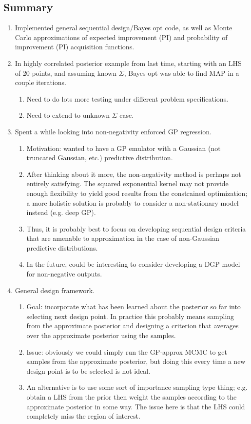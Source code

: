 \documentclass[12pt]{article}
\begin{document}
\subsection{Summary}
\begin{enumerate}
\item Implemented general sequential design/Bayes opt code, as well as Monte Carlo approximations of expected improvement (PI) and probability of 
improvement (PI) acquisition functions. 
\item In highly correlated posterior example from last time, starting with an LHS of 20 points, and assuming known $\Sigma$, Bayes opt was able to find MAP in a couple iterations. 
	\begin{enumerate}
	\item Need to do lots more testing under different problem specifications. 
	\item Need to extend to unknown $\Sigma$ case. 
	\end{enumerate}
\item Spent a while looking into non-negativity enforced GP regression. 
	\begin{enumerate}
	\item Motivation: wanted to have a GP emulator with a Gaussian (not truncated Gaussian, etc.) predictive distribution.   
	\item After thinking about it more, the non-negativity method is perhaps not entirely satisfying. The squared exponential kernel may not provide enough flexibility to 
	yield good results from the constrained optimization; a more holistic solution is probably to consider a non-stationary model instead (e.g. deep GP). 
	\item Thus, it is probably best to focus on developing sequential design criteria that are amenable to approximation in the case of non-Gaussian predictive distributions. 
	\item In the future, could be interesting to consider developing a DGP model for non-negative outputs. 
	\end{enumerate}
\item General design framework.
	\begin{enumerate}
	\item Goal: incorporate what has been learned about the posterior so far into selecting next design point. In practice this probably means sampling from the approximate 
	posterior and designing a criterion that averages over the approximate posterior using the samples. 
	\item Issue: obviously we could simply run the GP-approx MCMC to get samples from the approximate posterior, but doing this every time a new design point is to be selected is 
	not ideal. 
	\item An alternative is to use some sort of importance sampling type thing; e.g. obtain a LHS from the prior then weight the samples according to the approximate posterior in some 
	way. The issue here is that the LHS could completely miss the region of interest. 
	\end{enumerate}

\end{enumerate}
\end{document}
